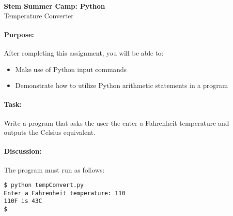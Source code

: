 \documentclass[11pt]{article}
\begin{document}
    \begin{center}

        \large\textbf{Stem Summer Camp: Python} \\
        Temperature Converter \\

    \end{center}

    \paragraph{Purpose:} After completing this assignment, you will be
    able to:

        \begin{itemize}

            \item Make use of Python input commands

            \item Demonstrate how to utilize Python arithmetic
                statements in a program

        \end{itemize}

    \paragraph{Task:} Write a program that asks the user the enter a
    Fahrenheit temperature and outputs the Celsius equivalent.  
    
    \paragraph{Discussion:} The program must run as follows:
    
    \vspace{1.5em}

\begin{verbatim}
$ python tempConvert.py
Enter a Fahrenheit temperature: 110
110F is 43C
$
\end{verbatim}
\end{document}
